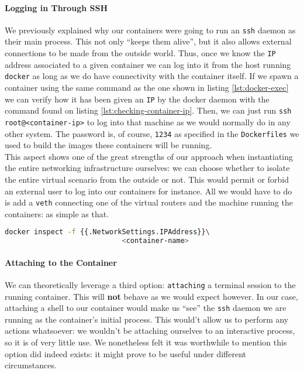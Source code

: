                 \paragraph{Logging in Through SSH}
                    We previously explained why our containers were going to run an \texttt{ssh} daemon as their main process. This not only ``keeps them alive'', but it also allows external connections to be made from the outside world. Thus, once we know the \texttt{IP} address associated to a given container we can log into it from the host running \texttt{docker} as long as we do have connectivity with the container itself. If we spawn a container using the same command as the one shown in listing \ref{lst:docker-exec} we can verify how it has been given an \texttt{IP} by the docker daemon with the command found on listing \ref{lst:checking-container-ip}. Then, we can just run \texttt{ssh root@<container-ip>} to log into that machine as we would normally do in any other system. The password is, of course, \texttt{1234} as specified in the \texttt{Dockerfiles} we used to build the images these containers will be running.\\

                    This aspect shows one of the great strengths of our approach when instantiating the entire networking infrastructure ourselves: we can choose whether to isolate the entire virtual scenario from the outside or not. This would permit or forbid an external user to log into our containers for instance. All we would have to do is add a \texttt{veth} connecting one of the virtual routers and the machine running the containers: as simple as that.\\

                    \begin{lstlisting}[language = bash, caption = Checking a container's \texttt{IP} address., label = lst:checking-container-ip]
                        docker inspect -f {{.NetworkSettings.IPAddress}}\
                            <container-name>
                    \end{lstlisting}

                \paragraph{Attaching to the Container}
                    We can theoretically leverage a third option: \texttt{attaching} a terminal session to the running container. This will \textbf{not} behave as we would expect however. In our case, attaching a shell to our container would make us ``see'' the \texttt{ssh} daemon we are running as the container's initial process. This would't allow us to perform any actions whatsoever: we wouldn't be attaching ourselves to an interactive process, so it is of very little use. We nonetheless felt it was worthwhile to mention this option did indeed exists: it might prove to be useful under different circumstances.\\

